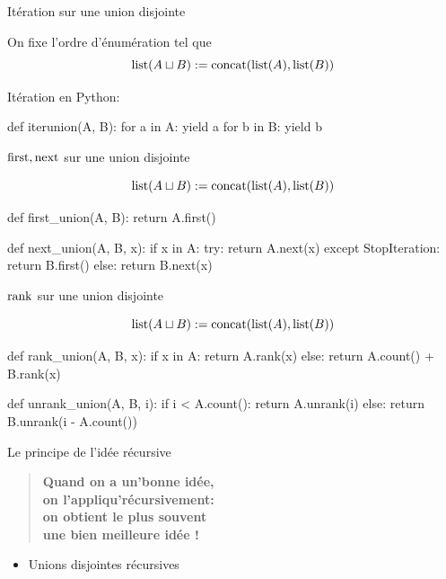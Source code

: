\documentclass{beamer}
\begin{document}
\begin{frame}[fragile]{Itération sur une union disjointe}

  On fixe l'ordre d'énumération tel que
  $$\operatorname{list}(A\sqcup B) := \operatorname{concat}(\operatorname{list}(A), \operatorname{list}(B))$$
  \bigskip

  Itération en Python:
\begin{listing}{1}
    def iterunion(A, B):
        for a in A:
            yield a
        for b in B:
            yield b
\end{listing}
\end{frame}

\begin{frame}[fragile]{$\operatorname{first}, \operatorname{next}$ sur une union disjointe}

  $$\operatorname{list}(A\sqcup B) := \operatorname{concat}(\operatorname{list}(A), \operatorname{list}(B))$$
\begin{listing}{1}
    def first_union(A, B):
        return A.first()

    def next_union(A, B, x):
        if x in A:
            try:
                return A.next(x)
            except StopIteration:
                return B.first()
        else:
            return B.next(x)
\end{listing}
\end{frame}


\begin{frame}[fragile]{$\operatorname{rank}$ sur une union disjointe}

  $$\operatorname{list}(A\sqcup B) := \operatorname{concat}(\operatorname{list}(A), \operatorname{list}(B))$$
\begin{listing}{1}
    def rank_union(A, B, x):
        if x in A:
            return A.rank(x)
        else:
            return A.count() + B.rank(x)

    def unrank_union(A, B, i):
        if i < A.count():
            return A.unrank(i)
        else:
            return B.unrank(i - A.count())
\end{listing}
\end{frame}

\begin{frame}{Le principe de l'idée récursive}

  \begin{verse}\bf\color{blue}\LARGE
    Quand on a un'bonne idée, \\
    on l'appliqu'récursivement: \\
    on obtient le plus souvent\\
    une bien meilleure idée !
  \end{verse}
  \pause\bigskip

  \begin{itemize}
  \item Unions disjointes récursives
  \end{itemize}
\end{frame}
\end{document}
